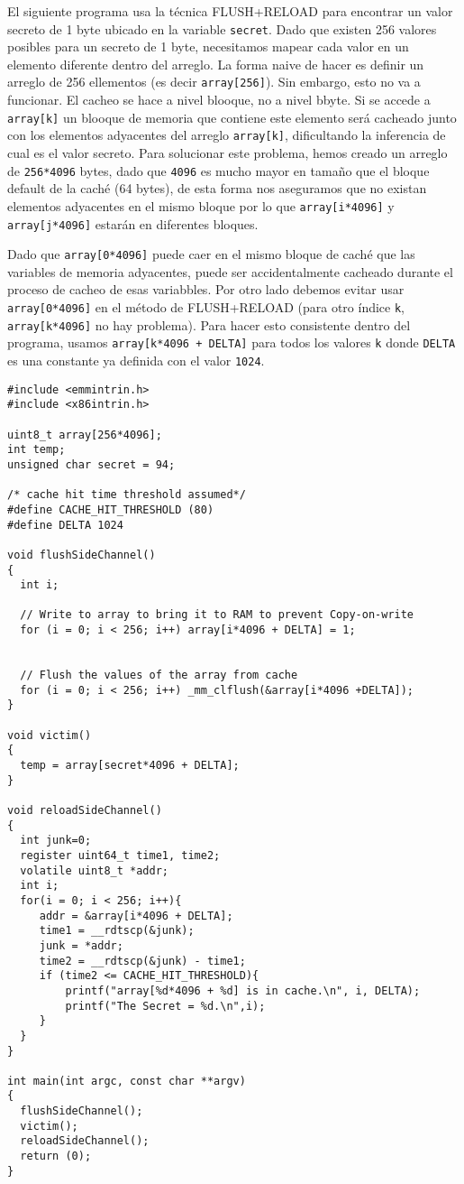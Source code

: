 El siguiente programa usa la técnica FLUSH+RELOAD para encontrar un valor secreto de 1 byte ubicado en la variable \texttt{secret}. Dado que existen 256 valores posibles para un secreto de 1 byte, necesitamos mapear cada valor en un elemento diferente dentro del arreglo. La forma naive de hacer es definir un arreglo de 256 ellementos (es decir \texttt{array[256]}). Sin embargo, esto no va a funcionar. El cacheo se hace a nivel blooque, no a nivel bbyte. Si se accede a \texttt{array[k]} un blooque de memoria que contiene este elemento será cacheado junto con los elementos adyacentes del arreglo \texttt{array[k]}, dificultando la inferencia de cual es el valor secreto.
Para solucionar este problema, hemos creado un arreglo de \texttt{256*4096} bytes, dado que \texttt{4096} es mucho mayor en tamaño que el bloque default de la caché (64 bytes), de esta forma nos aseguramos que no existan elementos adyacentes en el mismo bloque por lo que \texttt{array[i*4096]} y \texttt{array[j*4096]} estarán en diferentes bloques.

Dado que  \texttt{array[0*4096]} puede caer en el mismo bloque de caché que las variables de memoria adyacentes, puede ser accidentalmente cacheado durante el proceso de cacheo de esas variabbles. Por otro lado debemos evitar usar  \texttt{array[0*4096]} en el método de FLUSH+RELOAD (para otro índice \texttt{k}, \texttt{array[k*4096]} no hay problema).
Para hacer esto consistente dentro del programa, usamos \texttt{array[k*4096 + DELTA]} para todos los valores \texttt{k} donde \texttt{DELTA} es una constante ya definida con el valor \texttt{1024}. 


\begin{lstlisting}[caption=\texttt{FlushReload.c}, label={sidechannel:list:flushreload}]
#include <emmintrin.h>
#include <x86intrin.h>

uint8_t array[256*4096];
int temp;
unsigned char secret = 94;

/* cache hit time threshold assumed*/
#define CACHE_HIT_THRESHOLD (80)
#define DELTA 1024

void flushSideChannel()
{
  int i;

  // Write to array to bring it to RAM to prevent Copy-on-write
  for (i = 0; i < 256; i++) array[i*4096 + DELTA] = 1;


  // Flush the values of the array from cache
  for (i = 0; i < 256; i++) _mm_clflush(&array[i*4096 +DELTA]);
}

void victim()
{
  temp = array[secret*4096 + DELTA];
}

void reloadSideChannel() 
{
  int junk=0;
  register uint64_t time1, time2;
  volatile uint8_t *addr;
  int i;
  for(i = 0; i < 256; i++){
     addr = &array[i*4096 + DELTA];
     time1 = __rdtscp(&junk);
     junk = *addr;
     time2 = __rdtscp(&junk) - time1;
     if (time2 <= CACHE_HIT_THRESHOLD){
         printf("array[%d*4096 + %d] is in cache.\n", i, DELTA);
         printf("The Secret = %d.\n",i);
     }
  }	
}

int main(int argc, const char **argv) 
{
  flushSideChannel();
  victim();
  reloadSideChannel();
  return (0);
}
\end{lstlisting}



